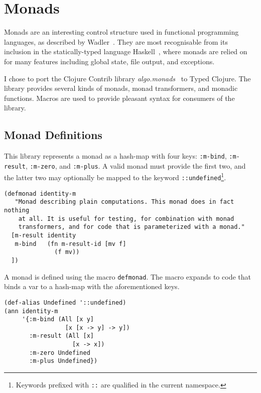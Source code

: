\section{Monads}
\label{sec:monads}

Monads are an interesting control structure used in functional programming languages,
as described by Wadler~\cite{Wad95}.
They are most recognisable from its inclusion in the statically-typed language Haskell~\cite{Mar10},
where monads are relied on for many features including global state, file output, and exceptions.

I chose to port the Clojure Contrib library \emph{algo.monads}~\cite{Hic12} to Typed Clojure. The library
provides several kinds of monads, monad transformers, and monadic functions.
Macros are used to provide pleasant syntax for consumers of the library.

\subsection{Monad Definitions}
\label{sec:monaddef}

This library represents a monad as a hash-map with four keys: \lstinline|:m-bind|, \lstinline|:m-result|,
\lstinline|:m-zero|, and \lstinline|:m-plus|. A valid monad must provide the first two, and the latter
two may optionally be mapped to the keyword \lstinline|::undefined|\footnote{Keywords prefixed with \lstinline|::|
are qualified in the current namespace.}.

\begin{lstlisting}[caption=Untyped definition for the identity monad, label=lst:identitymdef]
(defmonad identity-m
   "Monad describing plain computations. This monad does in fact nothing
    at all. It is useful for testing, for combination with monad
    transformers, and for code that is parameterized with a monad."
  [m-result identity
   m-bind   (fn m-result-id [mv f]
              (f mv))
  ])
\end{lstlisting}

A monad is defined using the macro \lstinline|defmonad|. The macro expands to code that binds a var to a hash-map
with the aforementioned keys.

\begin{lstlisting}[caption=Type for identity monad, label=lst:identitymtype]
(def-alias Undefined '::undefined)
(ann identity-m
     '{:m-bind (All [x y]
                 [x [x -> y] -> y])
       :m-result (All [x]
                   [x -> x])
       :m-zero Undefined
       :m-plus Undefined})
\end{lstlisting}

